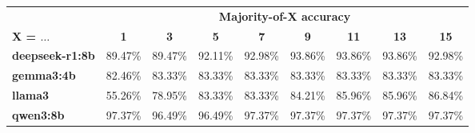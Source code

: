\begin{tabular}{|l|cccccccc|}\hline
	 & \multicolumn{8}{|c|}{\textbf{Majority-of-X accuracy}}\\
	\textbf{X = $\ldots$} & \textbf{1} & \textbf{3} & \textbf{5} & \textbf{7} & \textbf{9} & \textbf{11} & \textbf{13} & \textbf{15} \\\hline
	\textbf{deepseek-r1:8b} & 89.47\% & 89.47\% & 92.11\% & 92.98\% & 93.86\% & 93.86\% & 93.86\% & 92.98\% \\\hline
	\textbf{gemma3:4b} & 82.46\% & 83.33\% & 83.33\% & 83.33\% & 83.33\% & 83.33\% & 83.33\% & 83.33\% \\\hline
	\textbf{llama3} & 55.26\% & 78.95\% & 83.33\% & 83.33\% & 84.21\% & 85.96\% & 85.96\% & 86.84\% \\\hline
	\textbf{qwen3:8b} & 97.37\% & 96.49\% & 96.49\% & 97.37\% & 97.37\% & 97.37\% & 97.37\% & 97.37\% \\\hline
\end{tabular}
